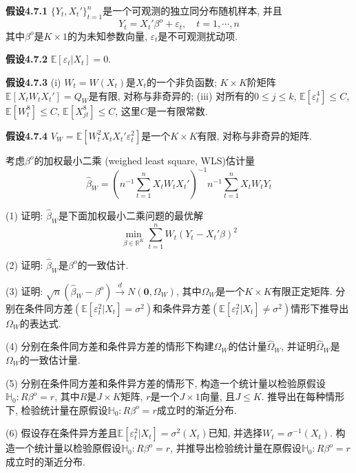 \documentclass[cn,12pt,math=mtpro2,citestyle=gb7714-2015,bibstyle=gb7714-2015,twocol,mode=simple]{elegantbook}
\newcommand{\E}{\mathbb{E}}
\newcommand{\hbeta}{\hat{\beta}}
\begin{document}
\textbf{假设4.7.1} $\{Y_t,X_t'\}_{t=1}^n$是一个可观测的独立同分布随机样本, 并且
  $$Y_t=X_t'\beta^o+\varepsilon_t,\quad t=1,\cdots,n$$
  其中$\beta^o$是$K\times1$的为未知参数向量, $\varepsilon_t$是不可观测扰动项.

\textbf{假设4.7.2} $\E[\varepsilon_t|X_t]=0$.

\textbf{假设4.7.3} (i) $W_t=W(X_t)$是$X_t$的一个非负函数; $K\times K$阶矩阵$\E[X_tW_tX_t']=Q_W$是有限, 对称与非奇异的; (iii) 对所有的$0\leq j\leq k$, $\E[\varepsilon_t^4]\leq C$, $\E[W_t^8]\leq C$, $\E[X_{jt}^8]\leq C$, 这里$C$是一有限常数.

\textbf{假设4.7.4} $V_W=\E[W_t^2X_tX_t'\varepsilon_t^2]$是一个$K\times K$有限, 对称与非奇异的矩阵.

考虑$\beta^o$的加权最小二乘 (weighed least square, WLS)估计量
  $$\hbeta_W=\left(n^{-1}\sum_{t=1}^{n} X_tW_tX_t'\right)^{-1}n^{-1}\sum_{t=1}^{n}X_tW_tY_t$$

(1) 证明: $\hbeta_W$是下面加权最小二乘问题的最优解
  $$\min_{\beta\in\mathbb{R}^K}\sum_{t=1}^{n}W_t(Y_t-X_t'\beta)^2$$

(2) 证明: $\hbeta_W$是$\beta^o$的一致估计.

(3) 证明: $\sqrt{n}(\hbeta_W-\beta^o)\xrightarrow{d}N(\mathbf{0},\Omega_W)$, 其中$\Omega_W$是一个$K\times K$有限正定矩阵. 分别在条件同方差$(\E[\varepsilon_t^2|X_t]=\sigma^2)$和条件异方差$(\E[\varepsilon_t^2|X_t]\neq \sigma^2)$情形下推导出$\Omega_W$的表达式.

(4) 分别在条件同方差和条件异方差的情形下构建$\Omega_W$的估计量$\hat{\Omega}_W$, 并证明$\hat{\Omega}_W$是$\Omega_W$的一致估计量.

(5) 分别在条件同方差和条件异方差的情形下, 构造一个统计量以检验原假设$\mathbb{H}_0: R\beta^o=r$, 其中$R$是$J\times K$矩阵, $r$是一个$J\times 1$向量, 且$J \leq K$. 推导出在每种情形下, 检验统计量在原假设$\mathbb{H}_0: R\beta^o=r$成立时的渐近分布.

(6) 假设存在条件异方差且$\E[\varepsilon_t^2|X_t]=\sigma^2(X_t)$已知, 并选择$W_t=\sigma^{-1}(X_t)$. 构造一个统计量以检验原假设$\mathbb{H}_0: R\beta^o=r$, 并推导出检验统计量在原假设$\mathbb{H}_0: R\beta^o=r$成立时的渐近分布.
\end{document}
